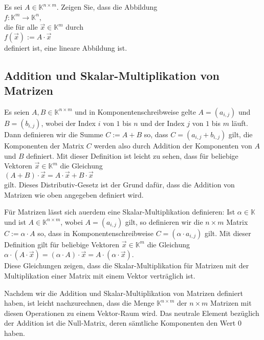 \exercise
Es sei $A \in \mathbb{K}^{n \times m}$.  Zeigen Sie, dass die Abbildung
\\[0.2cm]
\hspace*{1.3cm}
$f: \mathbb{K} ^m \rightarrow \mathbb{K}^n$,
\\[0.2cm]
die f\"{u}r alle $\vec{x} \in \mathbb{K}^m$ durch
\\[0.2cm]
\hspace*{1.3cm}
$f(\vec{x}) := A \cdot \vec{x}$
\\[0.2cm]
definiert ist, eine lineare Abbildung ist.
\exend


\subsection{Addition und Skalar-Multiplikation von Matrizen}
Es seien $A,B \in \mathbb{K}^{n \times m}$ und in Komponentenschreibweise gelte $A = (a_{i,j})$ und
$B = (b_{i,j})$, wobei der Index $i$ von $1$ bis $n$ und der Index $j$ von $1$ bis $m$ l\"{a}uft.  Dann
definieren wir die Summe $C := A + B$ so, dass $C = (a_{i,j} + b_{i,j})$ gilt, die Komponenten der
Matrix $C$ werden also durch Addition der Komponenten von $A$ und $B$  definiert.  Mit dieser
Definition ist leicht zu sehen, dass f\"{u}r beliebige Vektoren $\vec{x} \in \mathbb{K}^m$ die Gleichung
\\[0.2cm]
\hspace*{1.3cm}
$(A + B) \cdot \vec{x} = A \cdot \vec{x} + B \cdot \vec{x}$
\\[0.2cm]
gilt.  Dieses Distributiv-Gesetz ist der Grund daf\"{u}r, dass die Addition von Matrizen wie oben
angegeben definiert wird.


F\"{u}r Matrizen l\"{a}sst sich au\3erdem eine Skalar-Multiplikation definieren:  Ist $\alpha \in \mathbb{K}$
und ist $A \in \mathbb{K}^{n \times m}$, wobei $A = (a_{i,j})$ gilt, so definieren wir die $n \times m$ Matrix 
$C := \alpha \cdot A$ so, dass in Komponentenschreibweise $C = (\alpha \cdot a_{i,j})$ gilt.  Mit
dieser Definition gilt f\"{u}r beliebige Vektoren $\vec{x} \in \mathbb{K}^m$ die Gleichung
\\[0.2cm]
\hspace*{1.3cm}
$\alpha \cdot (A \cdot \vec{x}) = (\alpha \cdot A) \cdot \vec{x} = A \cdot (\alpha \cdot \vec{x})$.
\\[0.2cm]
Diese Gleichungen zeigen, dass die Skalar-Multiplikation f\"{u}r Matrizen mit der Multiplikation einer
Matrix mit einem Vektor vertr\"{a}glich ist.

\remark
Nachdem wir die Addition und Skalar-Multiplikation von Matrizen definiert haben, ist leicht
nachzurechnen, dass die Menge $\mathbb{K}^{n \times m}$ der $n \times m$ Matrizen mit diesen
Operationen zu einem Vektor-Raum wird.  Das neutrale Element bez\"{u}glich der Addition ist die
Null-Matrix, deren s\"{a}mtliche Komponenten den Wert $0$ haben.

